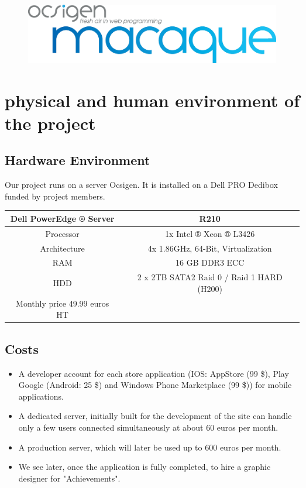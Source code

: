 \documentclass {life-en}
\begin{document}
\begin{figure} [H]
  \begin{center}
    \includegraphics[width = 13cm]{img/macaque.png}
  \end{center}
\end{figure}


\chapter{physical and human environment of the project}

\section{Hardware Environment}

Our project runs on a server Ocsigen. It is installed on a Dell PRO Dedibox funded by project members.

\vspace{20pt}

\begin{tabular}{| c | c |}
  \hline
   Dell PowerEdge ® Server & R210 \\
  \hline
  Processor & 1x Intel ® Xeon ® L3426 \\
  \hline
  Architecture & 4x 1.86GHz, 64-Bit, Virtualization \\
  \hline
  RAM & 16 GB DDR3 ECC \\
  \hline
  HDD & 2 x 2TB SATA2 Raid 0 / Raid 1 HARD (H200) \\
  \hline
  Monthly price 49.99 euros HT & \\
  \hline
\end{tabular}

\vspace{20pt}

\section{Costs}

\begin{itemize}
  \item A developer account for each store application (IOS: AppStore (99 \$), Play Google (Android: 25 \$) and Windows Phone Marketplace (99 \$)) for mobile applications.
  \item A dedicated server, initially built for the development of the site can handle only a few users connected simultaneously at about 60 euros per month.
  \item A production server, which will later be used up to 600 euros per month.
  \item We see later, once the application is fully completed, to hire a graphic designer for "Achievements".
\end{itemize}
\end{document}
